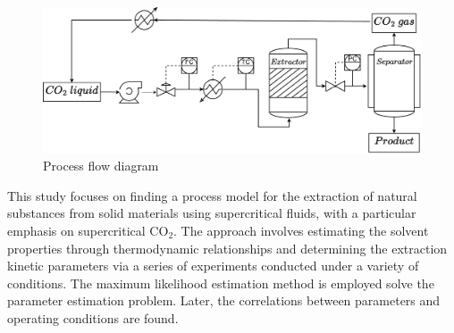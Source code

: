 \documentclass[../Article_Model_Parameters.tex]{subfiles}
\begin{document}
	\begin{figure}[h!]
		\centering
		\includegraphics[width=\columnwidth]{Figures/PFD.drawio.pdf}
		\caption{Process flow diagram}
		\label{fig: SFE_drawing}
	\end{figure}

	
		
	This study focuses on finding a process model for the extraction of natural substances from solid materials using supercritical fluids, with a particular emphasis on supercritical CO$_2$. The approach involves estimating the solvent properties through thermodynamic relationships and determining the extraction kinetic parameters via a series of experiments conducted under a variety of conditions. The maximum likelihood estimation method is employed solve the parameter estimation problem. Later, the correlations between parameters and operating conditions are found.
	
\end{document}

